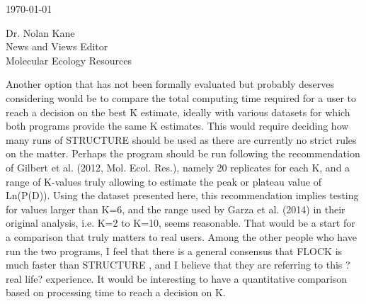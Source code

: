\documentclass[11pt]{letter}
\begin{document}
\begin{letter}{ \today 

Dr. Nolan Kane\\
News and Views Editor\\
Molecular Ecology Resources \\
}
Another option that has not been formally evaluated but probably deserves considering would be to compare the total computing time required for a user to reach a decision on the best K estimate, ideally with various datasets for which both programs provide the same K estimates. This would require deciding how many runs of STRUCTURE should be used as there are currently no strict rules on the matter. Perhaps the program should be run following the recommendation of Gilbert et al. (2012, Mol. Ecol. Res.), namely 20 replicates for each K, and a range of K-values truly allowing to estimate the peak or plateau value of Ln(P(D)). Using the dataset presented here, this recommendation implies testing for values larger than K=6, and the range used by Garza et al. (2014) in their original analysis, i.e. K=2 to K=10, seems reasonable. That would be a start for a comparison that truly matters to real users. Among the other people who have run the two programs, I feel that there is a general consensus that FLOCK is much faster than STRUCTURE , and I believe that they are referring to this ?real life? experience. It would be interesting to have a quantitative comparison based on processing time to reach a decision on K.


\end{letter}
\end{document}
